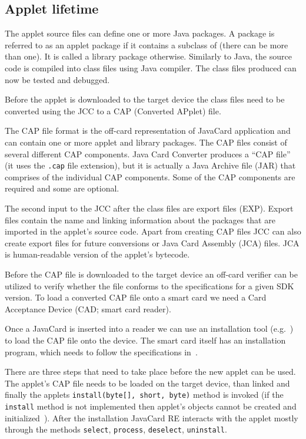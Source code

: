 \documentclass{../llncs/llncs}
\begin{document}
    \subsection{Applet lifetime}
The applet source files can define one or more Java packages. A package is referred to as an applet package if it contains a subclass of  (there can be more than one). It is called a library package otherwise.  Similarly to Java, the source code is compiled into class files using Java compiler. The class files produced can now be tested and debugged.

Before the applet is downloaded to the target device the class files need to be converted using the JCC to a CAP (Converted APplet) file.

The CAP file format is the off-card representation of JavaCard application and can contain one or more applet and library packages. The CAP files consist of several different CAP components. Java Card Converter produces a ``CAP file'' (it uses the \texttt{.cap} file extension), but it is actually a Java Archive file (JAR) that comprises of the individual CAP components. Some of the CAP components are required and some are optional.

The second input to the JCC after the class files are export files (EXP). Export files contain the name and linking information about the packages that are imported in the applet's source code.
Apart from creating CAP files JCC can also create export files for future conversions or Java Card Assembly (JCA) files. JCA is human-readable version of the applet's bytecode.

Before the CAP file is downloaded to the target device an off-card verifier can be utilized to verify whether the file conforms to the specifications for a given SDK version. To load a converted CAP file onto a smart card we need a Card Acceptance Device (CAD; smart card reader).

Once a JavaCard is inserted into a reader we can use an installation tool (e.g.~\cite{globalplatform}) to load the CAP file onto the device. The smart card itself has an installation program, which needs to follow the specifications in~\cite{jcspecs31download}.

There are three steps that need to take place before the new applet can be used. The applet's CAP file needs to be loaded on the target device, than linked and finally the applets \texttt{install(byte[], short, byte)} method is invoked (if the \texttt{install} method is not implemented then applet's objects cannot be created and initialized~\cite{jcspecs31download}). After the installation JavaCard RE interacts with the applet mostly through the methods \texttt{select}, \texttt{process}, \texttt{deselect}, \texttt{uninstall}.
\end{document}

